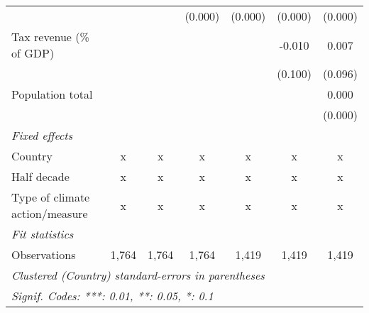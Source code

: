 \begin{tabular}{lcccccc}
                                                                                  &          &               & (0.000)       & (0.000)       & (0.000)       & (0.000)\\   
   Tax revenue (\% of GDP)                                                        &          &               &               &               & -0.010        & 0.007\\   
                                                                                  &          &               &               &               & (0.100)       & (0.096)\\   
   Population total                                                               &          &               &               &               &               & 0.000\\   
                                                                                  &          &               &               &               &               & (0.000)\\   
   \emph{Fixed effects}\\
   Country                                                                        & x        & x             & x             & x             & x             & x\\  
   Half decade                                                                    & x        & x             & x             & x             & x             & x\\  
   Type of climate action/measure                                                 & x        & x             & x             & x             & x             & x\\  
   \midrule \emph{Fit statistics}\\
   Observations                                                                   & 1,764    & 1,764         & 1,764         & 1,419         & 1,419         & 1,419\\  
   \midrule
   \multicolumn{7}{l}{\emph{Clustered (Country) standard-errors in parentheses}}\\
   \multicolumn{7}{l}{\emph{Signif. Codes: ***: 0.01, **: 0.05, *: 0.1}}\\
\end{tabular}
\par\endgroup


